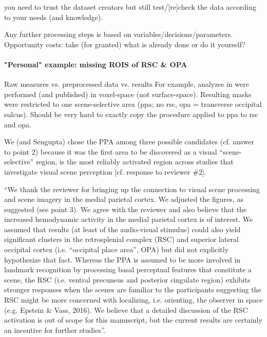 %
you need to trust the dataset creators but still test/[re]check the data
according to your needs (and knowledge).

%
Any further processing steps is based on variables/decisions/parameters.
%
Opportunity costs: take (for granted) what is already done or do it yourself?


\paragraph{"Personal" example: missing ROIS of RSC \& OPA}

%
Raw measures vs. preprocessed data vs. results
%
For example, analyzes in \citet{sengupta2016extension} were performed (and
published) in voxel-space (not surface-space).
%
Resulting masks were restricted to one scene-selective area (\ac{ppa}; no
\ac{rsc}, \ac{opa} = transverse occipital sulcus).
%
Should be very hard to exactly copy the procedure applied to \ac{ppa} to
\ac{rsc} and \ac{opa}.


We (and Sengupta) chose the PPA among three possible candidates (cf. answer to
point 2) because it was the first area to be discovered as a visual
``scene-selective'' region, is the most reliably activated region across studies
that investigate visual scene perception [cf. response to reviewer \#2].

``We thank the reviewer for bringing up the connection to visual scene
processing and scene imagery in the medial parietal cortex. We adjusted the
figures, as suggested (see point 3). We agree with the reviewer and also believe
that the increased hemodynamic activity in the medial parietal cortex is of
interest. We assumed that results (at least of the audio-visual stimulus) could
also yield significant clusters in the retrosplenial complex (RSC) and superior
lateral occipital cortex (i.e. “occipital place area”, OPA) but did not
explicitly hypothesize that fact. Whereas the PPA is assumed to be more involved
in landmark recognition by processing basal perceptual features that constitute
a scene, the RSC (i.e. ventral precuneus and posterior cingulate region)
exhibits stronger responses when the scenes are familiar to the participants
suggesting the RSC might be more concerned with localizing, i.e. orienting, the
observer in space (e.g. Epstein \& Vass, 2016). We believe that a detailed
discussion of the RSC activation is out of scope for this manuscript, but the
current results are certainly an incentive for further studies''.


